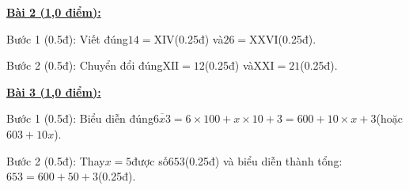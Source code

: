 \documentclass[11pt,a4paper]{article}
\begin{document}
\noindent\textbf{\underline{Bài 2 (1,0 điểm):}}\par\vspace{3pt}
Bước 1 (0.5đ): Viết đúng$14 = \mathrm{XIV}$(0.25đ) và$26 = \mathrm{XXVI}$(0.25đ).\par\noindent Bước 2 (0.5đ): Chuyển đổi đúng$\mathrm{XII} = 12$(0.25đ) và$\mathrm{XXI} = 21$(0.25đ).\par\vspace{8pt}

\noindent\textbf{\underline{Bài 3 (1,0 điểm):}}\par\vspace{3pt}
Bước 1 (0.5đ): Biểu diễn đúng$\overline{6x3} = 6 \times 100 + x \times 10 + 3 = 600 + 10 \times x + 3$(hoặc$603 + 10x$).\par\noindent Bước 2 (0.5đ): Thay$x = 5$được số$653$(0.25đ) và biểu diễn thành tổng:$653 = 600 + 50 + 3$(0.25đ).\par\vspace{8pt}
\end{document}
